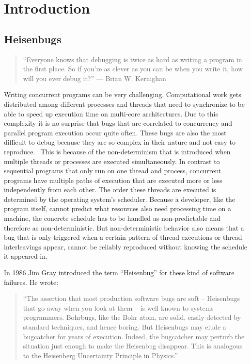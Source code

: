 \documentclass[conference]{IEEEtran}
\begin{document}
\section{Introduction}

\subsection{Heisenbugs}

\begin{quote}
``Everyone knows that debugging is twice as hard as writing a program in the first place. So if you're as clever as you can be when you write it, how will you ever debug it?'' --- Brian W. Kernighan\cite{kernighan1974elements}
\end{quote}

Writing concurrent programs can be very challenging.
Computational work gets distributed among different processes and threads that need to synchronize to be able to speed up execution time on multi-core architectures.
Due to this complexity it is no surprise that bugs that are correlated to concurrency and parallel program execution occur quite often.
These bugs are also the most difficult to debug because they are so complex in their nature and not easy to reproduce.~\cite{tu2019go}
This is because of the non-determinism that is introduced when multiple threads or processes are executed simultaneously.
In contrast to sequential programs that only run on one thread and process, concurrent programs have multiple paths of execution that are executed more or less independently from each other.
The order these threads are executed is determined by the operating system's scheduler.
Because a developer, like the program itself, cannot predict what resources also need processing time on a machine, the concrete schedule has to be handled as non-predictable and therefore as non-deterministic.
But non-deterministic behavior also means that a bug that is only triggered when a certain pattern of thread executions or thread interleavings appear, cannot be reliably reproduced without knowing the schedule it appeared in.

In 1986 Jim Gray introduced the term ``Heisenbug'' for these kind of software failures.
He wrote:

\begin{quote}
``The assertion that most production software bugs are soft -- Heisenbugs that go away when you look at them -- is well known to systems programmers. Bohrbugs, like the Bohr atom, are solid, easily detected by standard techniques, and hence boring. But Heisenbugs may elude a bugcatcher for years of execution. Indeed, the bugcatcher may perturb the situation just enough to make the Heisenbug disappear. This is analogous to the Heisenberg Uncertainty Principle in Physics.''\cite{gray1986computers}
\end{quote}
\end{document}
